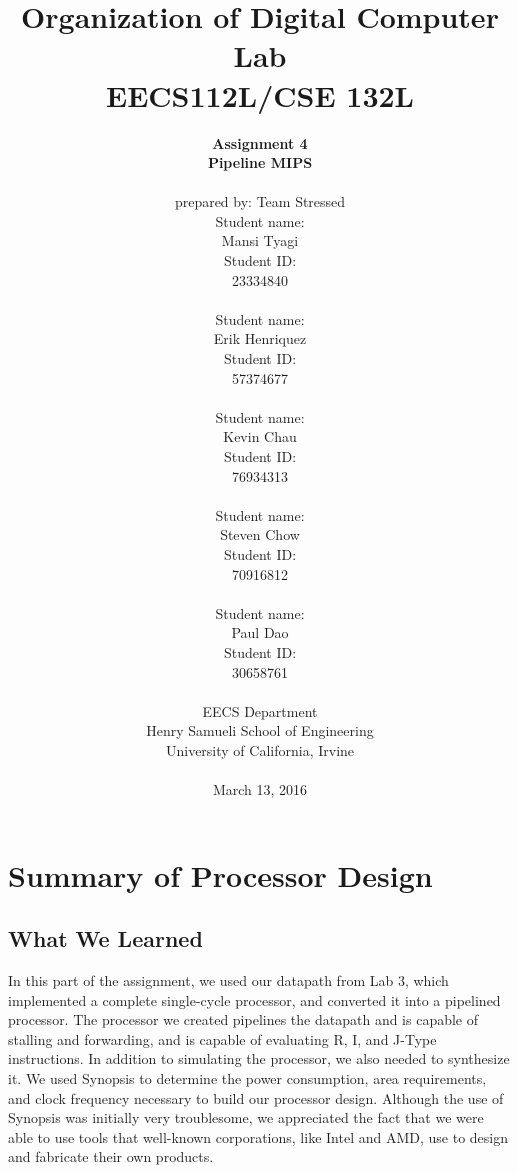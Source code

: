 \documentclass{article}
\begin{document}
\title{Organization of Digital Computer Lab \\ EECS112L/CSE 132L}
\author{\textbf{Assignment 4 }\\ \textbf{Pipeline MIPS} \\ \\
prepared by: Team Stressed \\ Student name: \\ Mansi Tyagi \\ Student ID: \\23334840\\ \\ Student name: \\ Erik Henriquez\\ Student ID: \\57374677\\ \\ Student name: \\ Kevin Chau \\ Student ID: \\76934313\\ \\ Student name: \\ Steven Chow\\Student ID: \\70916812\\ \\ Student name: \\ Paul Dao \\Student ID: \\30658761\\ \\
EECS Department\\ Henry Samueli School of Engineering \\ University of California, Irvine \\ \\
{March 13, 2016}} 


\date{}
\maketitle


\section{Summary of Processor Design}
\subsection{What We Learned}
In this part of the assignment, we used our datapath from Lab 3, which implemented a complete single-cycle processor, and converted it into a pipelined processor. The processor we created pipelines the datapath and is capable of stalling and forwarding, and is capable of evaluating R, I, and J-Type instructions. In addition to simulating the processor, we also needed to synthesize it. We used Synopsis to determine the power consumption, area requirements, and clock frequency necessary to build our processor design. Although the use of Synopsis was initially very troublesome, we appreciated the fact that we were able to use tools that well-known corporations, like Intel and AMD, use to design and fabricate their own products.
\end{document}
